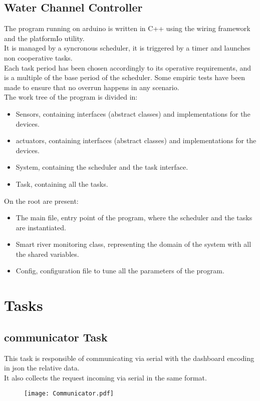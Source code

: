 \subsection{Water Channel Controller}
The program running on arduino is written in C++ using the wiring framework and the platformIo utility.\\
It is managed by a syncronous scheduler, it is triggered by a timer and launches non cooperative tasks.\\
Each task period has been chosen accordingly to its operative requirements, and is a multiple of the base period of the scheduler.
Some empiric tests have been made to ensure that no overrun happens in any scenario.\\
The work tree of the program is divided in:
\begin{itemize}
    \item Sensors, containing interfaces (abstract classes) and implementations for the devices.
    \item actuators, containing interfaces (abstract classes) and implementations for the devices.
    \item System, containing the scheduler and the task interface.
    \item Task, containing all the tasks.
\end{itemize}
On the root are present:
\begin{itemize}
    \item The main file, entry point of the program, where the scheduler and the tasks are instantiated.
    \item Smart river monitoring class, representing the domain of the system with all the shared variables.
    \item Config, configuration file to tune all the parameters of the program.
\end{itemize}
\pagebreak

\section{Tasks}
\subsection{communicator Task}
This task is responsible of communicating via serial with the dashboard encoding in json the relative data.\\
It also collects the request incoming via serial in the same format.
\begin{figure}[H]
    \centering
\texttt{[image: Communicator.pdf]}
\end{figure}
\pagebreak
